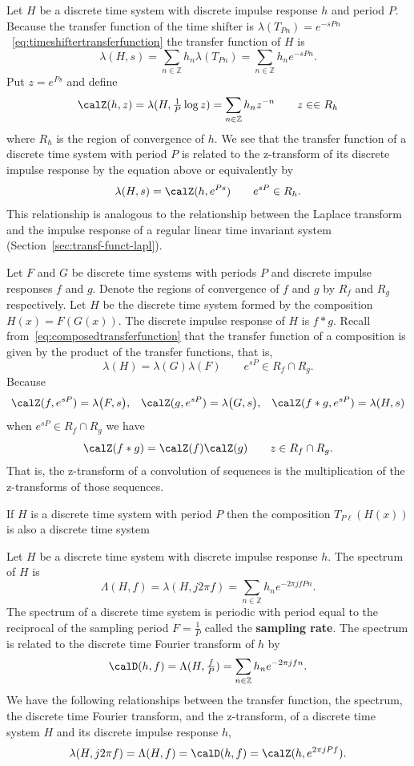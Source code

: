 \documentclass[11pt,a4paper]{book}
\theoremstyle{plain}
\numberwithin{equation}{section}
\newcommand{\ints}{{\mathbb Z}}
\newcommand{\term}{\textbf}
\begin{document}
Let $H$ be a discrete time system with discrete impulse response $h$ and period $P$.  Because the transfer function of the time shifter is $\lambda(T_{Pn}) = e^{-sPn}$~\eqref{eq:timeshiftertransferfunction} the transfer function of $H$ is
\[
\lambda(H,s) = \sum_{n \in \ints} h_n \lambda( T_{Pn} ) = \sum_{n \in \ints} h_n e^{-sP n}.
\]
Put $z = e^{Ps}$ and define
\[
\calZ(h,z) = \lambda(H, \tfrac{1}{P} \log z) = \sum_{n \in \ints} h_n z^{-n} \qquad z \in \in R_h
\]
where $R_h$ is the region of convergence of $h$.  We see that the transfer function of a discrete time system with period $P$ is related to the z-transform of its discrete impulse response by the equation above or equivalently by
\begin{equation}\label{eq:reltransferfunztrans}
\lambda(H,s) = \calZ(h,e^{Ps}) \qquad e^{sP} \in R_h.
\end{equation}
This relationship is analogous to the relationship between the Laplace transform and the impulse response of a regular linear time invariant system (Section~\ref{sec:transf-funct-lapl}).

Let $F$ and $G$ be discrete time systems with periods $P$ and discrete impulse responses $f$ and $g$.  Denote the regions of convergence of $f$ and $g$ by $R_f$ and $R_g$ respectively.  Let $H$ be the discrete time system formed by the composition $H(x)=F(G(x))$.  The discrete impulse response of $H$ is $f * g$.  Recall from~\eqref{eq:composedtransferfunction} that the transfer function of a composition is given by the product of the transfer functions, that is,
\[
\lambda( H ) = \lambda(G)\lambda(F) \qquad e^{sP} \in R_f \cap R_g.
\]
Because
\[
\calZ(f, e^{sP}) = \lambda\big( F ,s \big) , \;\;\; \calZ(g, e^{sP}) = \lambda\big( G ,s \big), \;\;\; \calZ(f * g, e^{sP}) = \lambda( H ,s )
\]
when $e^{sP} \in R_f \cap R_g$ we have
\[
\calZ( f * g) = \calZ(f) \calZ(g) \qquad z \in R_f \cap R_g.
\]
That is, the z-transform of a convolution of sequences is the multiplication of the z-transforms of those sequences.

If $H$ is a discrete time system with period $P$ then the composition $T_{P\ell}(H(x))$ is also a discrete time system

Let $H$ be a discrete time system with discrete impulse response $h$.  The spectrum of $H$ is
\[
\Lambda(H,f) = \lambda(H, j2\pi f) = \sum_{n \in \ints} h_n e^{-2\pi j f P n}.
\]
The spectrum of a discrete time system is periodic with period equal to the reciprocal of the sampling period $F = \frac{1}{P}$ called the \term{sampling rate}. The spectrum is related to the discrete time Fourier transform of $h$ by
\[
\calD(h,f) = \Lambda(H,\tfrac{f}{P}) =\sum_{n \in \ints} h_n e^{-2\pi j f n}.
\]
We have the following relationships between the transfer function, the spectrum, the discrete time Fourier transform, and the z-transform, of a discrete time system $H$ and its discrete impulse response $h$,
\[
\lambda(H, j2\pi f) = \Lambda(H,f) = \calD(h,f) = \calZ(h, e^{2\pi j P f}).
\]
\end{document}
